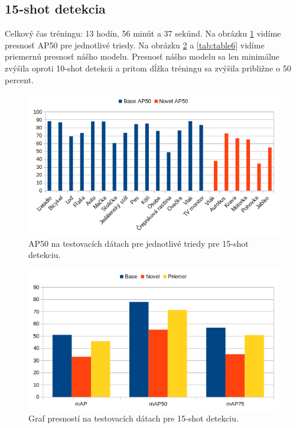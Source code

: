 \subsection{15-shot detekcia}

Celkový čas tréningu: 13 hodín, 56 minút a 37 sekúnd. Na obrázku \ref{fig:image34} vidíme presnosť AP50 pre jednotlivé triedy. Na obrázku \ref{fig:image36} a \ref{tab:table6} vidíme priemernú presnosť nášho modelu. Presnosť nášho modelu sa len minimálne zvýšila oproti 10-shot detekcii a pritom dĺžka tréningu sa zvýšila približne o 50 percent.

\begin{figure}[H]
\includegraphics[width=\textwidth]{images/15_shot_classes_AP50.png}
\centering
\caption{AP50 na testovacích dátach pre jednotlivé triedy pre 15-shot detekciu.}
\label{fig:image34}
\end{figure}

\begin{figure}[H]
\includegraphics[width=\textwidth]{images/15_shot_meanAP.png}
\centering
\caption{Graf presností na testovacích dátach pre 15-shot detekciu.}
\label{fig:image36}
\end{figure}

